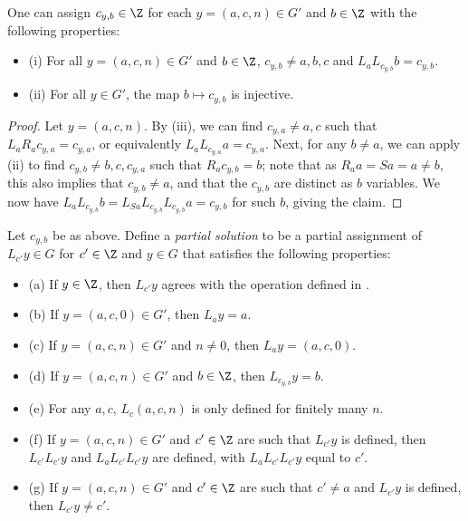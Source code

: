 \begin{lemma}\label{aux}  One can assign $c_{y,b} \in \Z$ for each $y = (a,c,n) \in G'$ and $b \in \Z$ with the following properties:
\begin{itemize}
\item (i)  For all $y = (a,c,n) \in G'$ and $b \in \Z$, $c_{y,b} \neq a,b,c$ and $L_a L_{c_{y,b}} b = c_{y,b}$.
\item (ii) For all $y \in G'$, the map $b \mapsto c_{y,b}$ is injective.
\end{itemize}

\end{lemma}

\begin{proof}  Let $y = (a,c,n)$.  By  (iii), we can find $c_{y,a} \neq a,c$ such that $L_a R_a c_{y,a} = c_{y,a}$, or equivalently $L_a L_{c_{y,a}} a = c_{y,a}$.  Next, for any $b \neq a$, we can apply  (ii) to find $c_{y,b} \neq b, c, c_{y,a}$ such that $R_a c_{y,b} = b$; note that as $R_a a = Sa = a \neq b$, this also implies that $c_{y,b} \neq a$, and that the $c_{y,b}$ are distinct as $b$ variables.  We now have $L_a L_{c_{y,b}} b = L_{Sa} L_{c_{y,b}} L_{c_{y,b}} a = c_{y,b}$ for such $b$, giving the claim.
\end{proof}

Let $c_{y,b}$ be as above. Define a \emph{partial solution} to be a partial assignment of $L_{c'} y \in G$ for $c' \in \Z$ and $y \in G$ that satisfies the following properties:
\begin{itemize}
\item (a) If $y \in \Z$, then $L_{c'} y$ agrees with the operation defined in .
\item (b) If $y = (a,c,0) \in G'$, then $L_a y = a$.
\item (c) If $y = (a,c,n) \in G'$ and $n \neq 0$, then $L_a y = (a,c,0)$.
\item (d) If $y = (a,c,n) \in G'$ and $b \in \Z$, then $L_{c_{y,b}} y = b$.
\item (e) For any $a,c$, $L_c (a,c,n)$ is only defined for finitely many $n$.
\item (f) If $y = (a,c,n) \in G'$ and $c' \in \Z$ are such that $L_{c'} y$ is defined, then $L_{c'} L_{c'} y$ and $L_a L_{c'} L_{c'} y$ are defined, with $L_a L_{c'} L_{c'} y$ equal to $c'$.
\item (g) If $y = (a,c,n) \in G'$ and $c' \in \Z$ are such that $c' \neq a$ and $L_{c'} y$ is defined, then $L_{c'} y \neq c'$.
\end{itemize}

